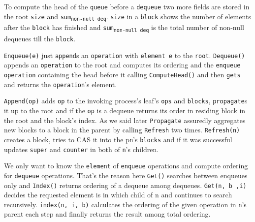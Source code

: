 \documentclass[10pt]{article}
\theoremstyle{definition}
\begin{document}
To compute the head of the \texttt{queue} before a \texttt{dequeue} two more fields are stored in the root \texttt{size} and \texttt{sum\textsubscript{non-null deq}}. \texttt{size} in a \texttt{block} shows the number of elements after the \texttt{block} has finished and \texttt{sum\textsubscript{non-null deq}} is the total number of non-null dequeues till the \texttt{block}.

\texttt{Enqueue(e)} just \texttt{append}s an \texttt{operation} with \texttt{element e} to the \texttt{root}. \texttt{Dequeue()} appends an \texttt{operation} to the root and computes its ordering and the \texttt{enqueue operation} containing the head before it calling \texttt{ComputeHead()} and then \texttt{gets} and returns the \texttt{operation}'s element.

\texttt{Append(op)} adds \texttt{op} to the invoking process's leaf's \texttt{ops} and \texttt{blocks}, \texttt{propagate}s it up to the root and if the \texttt{op} is a dequeue returns its order in residing block in the root and the block's index. As we said later \texttt{Propagate} assuredly aggregates new blocks to a block in the parent by calling \texttt{Refresh} two times. \texttt{Refresh(n)} creates a block, tries to CAS it into the p\texttt{n}'s \texttt{blocks} and if it was successful updates \texttt{super} and \texttt{counter} in both of \texttt{n}'s children.

We only want to know the \texttt{element} of \texttt{enqueue} operations and compute ordering for \texttt{dequeue} operations. That's the reason here \texttt{Get()} searches between enqueues only and \texttt{Index()} returns ordering of a dequeue among dequeues. \texttt{Get(n, b ,i)} decides the requested element is in which child of n and continues to search recursively. \texttt{index(n, i, b)} calculates the ordering of the given operation in \texttt{n}'s parent each step and finally returns the result among total ordering.

\pagebreak
\newpage
{}
\end{document}
